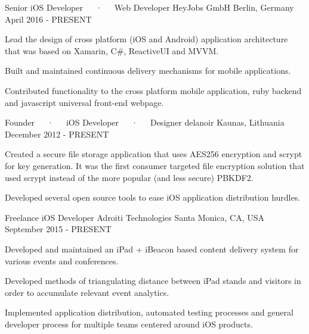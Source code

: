 

\begin{cventries}

  \cventry
    {Senior iOS Developer~~~·~~~Web Developer} %
    {HeyJobs GmbH} %
    {Berlin, Germany} %
    {April 2016 - PRESENT} %
    {
      \begin{cvitems} %
        \item {Lead the design of cross platform (iOS and Android) application architecture that was based on Xamarin, C\#, ReactiveUI and MVVM.}
        \item {Built and maintained continuous delivery mechanisms for mobile applications.}
        \item {Contributed functionality to the cross platform mobile application, ruby backend and javascript universal front-end webpage.}
      \end{cvitems}
    }

  \cventry
    {Founder~~~·~~~iOS Developer~~~·~~~Designer} %
    {delanoir} %
    {Kaunas, Lithuania} %
    {December 2012 - PRESENT} %
    {
      \begin{cvitems} %
        \item {Created a secure file storage application that uses AES256 encryption and scrypt for key generation. It was the first consumer targeted file encryption solution that used scrypt instead of the more popular (and less secure) PBKDF2.}
        \item {Developed several open source tools to ease iOS application distribution hurdles.}
      \end{cvitems}
    }

  \cventry
    {Freelance iOS Developer} %
    {Adroiti Technologies} %
    {Santa Monica, CA, USA} %
    {September 2015 - PRESENT} %
    {
      \begin{cvitems} %
        \item {Developed and maintained an iPad + iBeacon based content delivery system for various events and conferences.}
        \item {Developed methods of triangulating distance between iPad stands and visitors in order to accumulate relevant event analytics.}
        \item {Implemented application distribution, automated testing processes and general developer process for multiple teams centered around iOS products.}
      \end{cvitems}
    }


\end{cventries}
